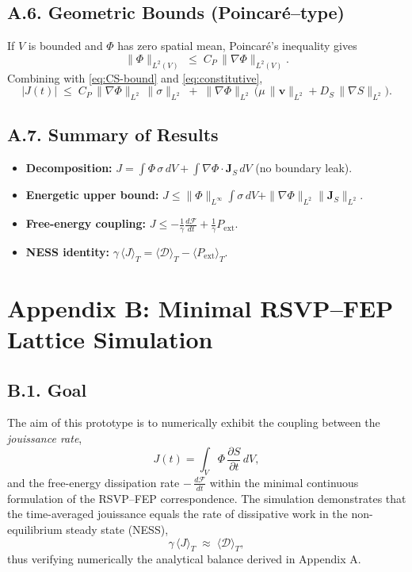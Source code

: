 \documentclass[12pt,a4paper]{article}
\begin{document}
\subsection*{A.6. Geometric Bounds (Poincaré–type)}
If \(V\) is bounded and $\Phi$ has zero spatial mean, Poincaré’s inequality gives
\[
\|\Phi\|_{L^2(V)} \;\le\; C_P\,\|\nabla\Phi\|_{L^2(V)}.
\]
Combining with \eqref{eq:CS-bound} and \eqref{eq:constitutive},
\begin{equation}
|J(t)| \;\le\; C_P\,\|\nabla\Phi\|_{L^2}\,\|\sigma\|_{L^2}
\;+\; \|\nabla\Phi\|_{L^2}\,\big(\mu\,\|\mathbf{v}\|_{L^2} + D_S\,\|\nabla S\|_{L^2}\big).
\end{equation}

\subsection*{A.7. Summary of Results}
\begin{itemize}[leftmargin=1.2em]
  \item \textbf{Decomposition:} \(J=\int\Phi\,\sigma\,dV+\int\nabla\Phi\!\cdot\!\mathbf{J}_S\,dV\) (no boundary leak).
  \item \textbf{Energetic upper bound:} \(J \le \|\Phi\|_{L^\infty}\!\int\sigma\,dV + \|\nabla\Phi\|_{L^2}\|\mathbf{J}_S\|_{L^2}\).
  \item \textbf{Free-energy coupling:} \(\displaystyle J \le -\frac{1}{\gamma}\frac{d\mathcal{F}}{dt} + \frac{1}{\gamma}P_{\text{ext}}\).
  \item \textbf{NESS identity:} \(\displaystyle \gamma\,\langle J\rangle_T = \langle \mathcal{D}\rangle_T - \langle P_{\text{ext}}\rangle_T\).
\end{itemize}

\section*{Appendix B: Minimal RSVP–FEP Lattice Simulation}

\subsection*{B.1. Goal}

The aim of this prototype is to numerically exhibit the coupling between the
\emph{jouissance rate},
\[
J(t) = \int_V \Phi\,\frac{\partial S}{\partial t}\,dV,
\]
and the free-energy dissipation rate \(-\,\tfrac{d\mathcal{F}}{dt}\) within the minimal continuous formulation of the RSVP–FEP correspondence.
The simulation demonstrates that the time-averaged jouissance equals the rate of dissipative work in the non-equilibrium steady state (NESS),
\[
\gamma\,\langle J\rangle_T \;\approx\; \langle\mathcal{D}\rangle_T,
\]
thus verifying numerically the analytical balance derived in Appendix A.
\end{document}
